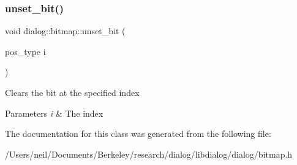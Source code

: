 \subsubsection{\texorpdfstring{unset\+\_\+bit()}{unset\_bit()}}
{\footnotesize\ttfamily void dialog\+::bitmap\+::unset\+\_\+bit (\begin{DoxyParamCaption}\item[{pos\+\_\+type}]{i }\end{DoxyParamCaption})\hspace{0.3cm}{\ttfamily [inline]}}

Clears the bit at the specified index 
\begin{DoxyParams}{Parameters}
{\em i} & The index \\
\hline
\end{DoxyParams}


The documentation for this class was generated from the following file\+:\begin{DoxyCompactItemize}
\item 
/\+Users/neil/\+Documents/\+Berkeley/research/dialog/libdialog/dialog/bitmap.\+h\end{DoxyCompactItemize}

